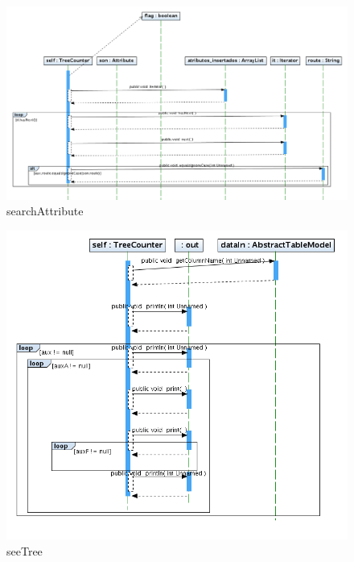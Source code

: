 \documentclass[letterpaper,12pt]{report}
\begin{document}
\begin{figure}
\centering
\includegraphics[width=1\textwidth]{TreeCounter/searchAttribute.png}
\caption{searchAttribute}
\end{figure}
\newpage
\begin{figure}
\centering
\includegraphics[width=1\textwidth]{TreeCounter/seeTree.png}
\caption{seeTree}
\end{figure}
\newpage

\end{document}
